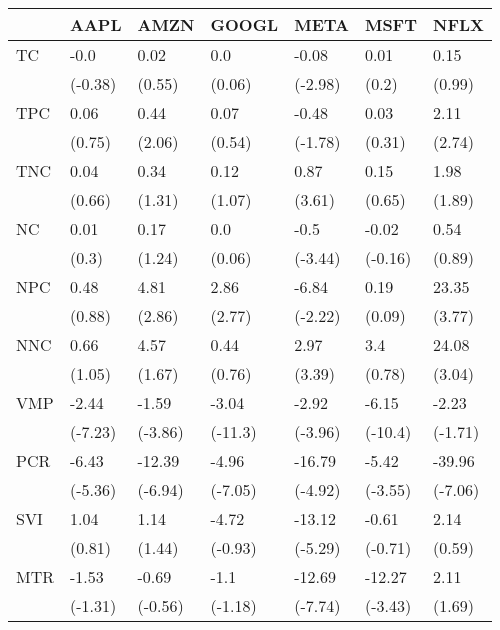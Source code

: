 \begin{tabular}{lllllll}
\toprule
{} &     AAPL &     AMZN &    GOOGL &     META &     MSFT &     NFLX \\
\midrule
TC  &     -0.0 &     0.02 &      0.0 &    -0.08 &     0.01 &     0.15 \\
    &  (-0.38) &   (0.55) &   (0.06) &  (-2.98) &    (0.2) &   (0.99) \\
TPC &     0.06 &     0.44 &     0.07 &    -0.48 &     0.03 &     2.11 \\
    &   (0.75) &   (2.06) &   (0.54) &  (-1.78) &   (0.31) &   (2.74) \\
TNC &     0.04 &     0.34 &     0.12 &     0.87 &     0.15 &     1.98 \\
    &   (0.66) &   (1.31) &   (1.07) &   (3.61) &   (0.65) &   (1.89) \\
NC  &     0.01 &     0.17 &      0.0 &     -0.5 &    -0.02 &     0.54 \\
    &    (0.3) &   (1.24) &   (0.06) &  (-3.44) &  (-0.16) &   (0.89) \\
NPC &     0.48 &     4.81 &     2.86 &    -6.84 &     0.19 &    23.35 \\
    &   (0.88) &   (2.86) &   (2.77) &  (-2.22) &   (0.09) &   (3.77) \\
NNC &     0.66 &     4.57 &     0.44 &     2.97 &      3.4 &    24.08 \\
    &   (1.05) &   (1.67) &   (0.76) &   (3.39) &   (0.78) &   (3.04) \\
VMP &    -2.44 &    -1.59 &    -3.04 &    -2.92 &    -6.15 &    -2.23 \\
    &  (-7.23) &  (-3.86) &  (-11.3) &  (-3.96) &  (-10.4) &  (-1.71) \\
PCR &    -6.43 &   -12.39 &    -4.96 &   -16.79 &    -5.42 &   -39.96 \\
    &  (-5.36) &  (-6.94) &  (-7.05) &  (-4.92) &  (-3.55) &  (-7.06) \\
SVI &     1.04 &     1.14 &    -4.72 &   -13.12 &    -0.61 &     2.14 \\
    &   (0.81) &   (1.44) &  (-0.93) &  (-5.29) &  (-0.71) &   (0.59) \\
MTR &    -1.53 &    -0.69 &     -1.1 &   -12.69 &   -12.27 &     2.11 \\
    &  (-1.31) &  (-0.56) &  (-1.18) &  (-7.74) &  (-3.43) &   (1.69) \\
\bottomrule
\end{tabular}
